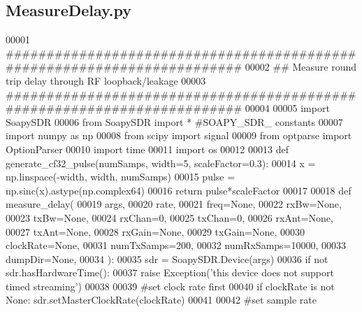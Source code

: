 \subsection{Measure\+Delay.\+py}
\label{MeasureDelay_8py_source}

\begin{DoxyCode}
00001 \textcolor{comment}{########################################################################}
00002 \textcolor{comment}{## Measure round trip delay through RF loopback/leakage}
00003 \textcolor{comment}{########################################################################}
00004 
00005 \textcolor{keyword}{import} SoapySDR
00006 \textcolor{keyword}{from} SoapySDR \textcolor{keyword}{import} * \textcolor{comment}{#SOAPY\_SDR\_ constants}
00007 \textcolor{keyword}{import} numpy \textcolor{keyword}{as} np
00008 \textcolor{keyword}{from} scipy \textcolor{keyword}{import} signal
00009 \textcolor{keyword}{from} optparse \textcolor{keyword}{import} OptionParser
00010 \textcolor{keyword}{import} time
00011 \textcolor{keyword}{import} os
00012 
00013 \textcolor{keyword}{def }generate_cf32_pulse(numSamps, width=5, scaleFactor=0.3):
00014     x = np.linspace(-width, width, numSamps)
00015     pulse = np.sinc(x).astype(np.complex64)
00016     \textcolor{keywordflow}{return} pulse*scaleFactor
00017 
00018 \textcolor{keyword}{def }measure_delay(
00019     args,
00020     rate,
00021     freq=\textcolor{keywordtype}{None},
00022     rxBw=\textcolor{keywordtype}{None},
00023     txBw=\textcolor{keywordtype}{None},
00024     rxChan=0,
00025     txChan=0,
00026     rxAnt=\textcolor{keywordtype}{None},
00027     txAnt=\textcolor{keywordtype}{None},
00028     rxGain=\textcolor{keywordtype}{None},
00029     txGain=\textcolor{keywordtype}{None},
00030     clockRate=\textcolor{keywordtype}{None},
00031     numTxSamps=200,
00032     numRxSamps=10000,
00033     dumpDir=\textcolor{keywordtype}{None},
00034 ):
00035     sdr = SoapySDR.Device(args)
00036     \textcolor{keywordflow}{if} \textcolor{keywordflow}{not} sdr.hasHardwareTime():
00037         \textcolor{keywordflow}{raise} Exception(\textcolor{stringliteral}{'this device does not support timed streaming'})
00038 
00039     \textcolor{comment}{#set clock rate first}
00040     \textcolor{keywordflow}{if} clockRate \textcolor{keywordflow}{is} \textcolor{keywordflow}{not} \textcolor{keywordtype}{None}: sdr.setMasterClockRate(clockRate)
00041 
00042     \textcolor{comment}{#set sample rate}

\end{DoxyCode}
